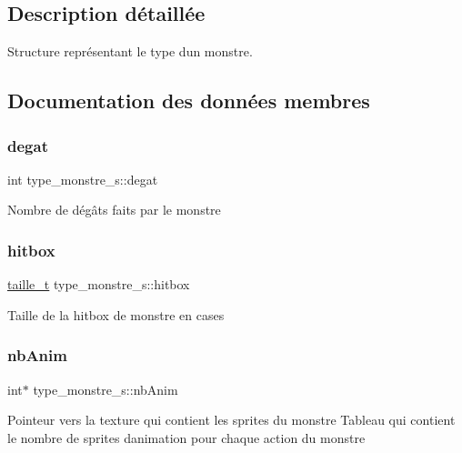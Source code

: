 \subsection{Description détaillée}
Structure représentant le type d\textquotesingle{}un monstre. 

\subsection{Documentation des données membres}
\mbox{\label{structtype__monstre__s_aa3e5568720dc977348e6929f3df5260c}} 
\subsubsection{\texorpdfstring{degat}{degat}}
{\footnotesize\ttfamily int type\+\_\+monstre\+\_\+s\+::degat}

Nombre de dégâts faits par le monstre \mbox{\label{structtype__monstre__s_ac0afaa340c029c12a6939d4b09fd3966}} 
\subsubsection{\texorpdfstring{hitbox}{hitbox}}
{\footnotesize\ttfamily \hyperlink{structtaille__s}{taille\+\_\+t} type\+\_\+monstre\+\_\+s\+::hitbox}

Taille de la hitbox de monstre en cases \mbox{\label{structtype__monstre__s_aecf18b6fa00e710fe27de2d1b738e62c}} 
\subsubsection{\texorpdfstring{nb\+Anim}{nbAnim}}
{\footnotesize\ttfamily int$\ast$ type\+\_\+monstre\+\_\+s\+::nb\+Anim}

Pointeur vers la texture qui contient les sprites du monstre Tableau qui contient le nombre de sprites d\textquotesingle{}animation pour chaque action du monstre \mbox{\label{structtype__monstre__s_a0f60370f9ae95fff9ab024fbf6485df6}} 
